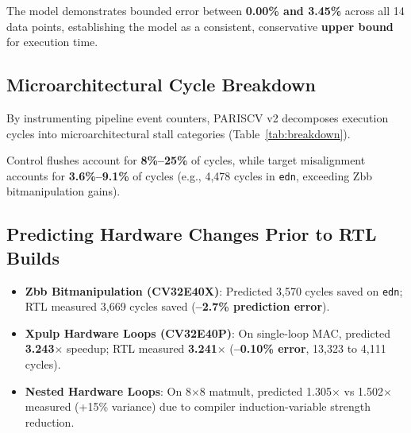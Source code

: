 \documentclass[conference]{IEEEtran}
\begin{document}
The model demonstrates bounded error between \textbf{0.00\% and 3.45\%} across all 14 data points, establishing the model as a consistent, conservative \textbf{upper bound} for execution time.

\subsection{Microarchitectural Cycle Breakdown}
By instrumenting pipeline event counters, PARISCV v2 decomposes execution cycles into microarchitectural stall categories (Table~\ref{tab:breakdown}).

\begin{table}[t]
\centering
\caption{Cycle Breakdown by Microarchitectural Cause}
\label{tab:breakdown}
\vspace{-4pt}
\end{table}

Control flushes account for \textbf{8\%--25\%} of cycles, while target misalignment accounts for \textbf{3.6\%--9.1\%} of cycles (e.g., 4,478 cycles in \texttt{edn}, exceeding Zbb bitmanipulation gains).

\subsection{Predicting Hardware Changes Prior to RTL Builds}
\begin{itemize}
    \item \textbf{Zbb Bitmanipulation (CV32E40X)}: Predicted 3,570 cycles saved on \texttt{edn}; RTL measured 3,669 cycles saved (\textbf{--2.7\% prediction error}).
    \item \textbf{Xpulp Hardware Loops (CV32E40P)}: On single-loop MAC, predicted \textbf{3.243$\times$} speedup; RTL measured \textbf{3.241$\times$} (\textbf{--0.10\% error}, 13,323 to 4,111 cycles).
    \item \textbf{Nested Hardware Loops}: On 8$\times$8 matmult, predicted 1.305$\times$ vs 1.502$\times$ measured (+15\% variance) due to compiler induction-variable strength reduction.
\end{itemize}
\end{document}
